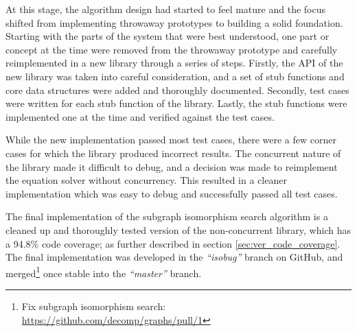 At this stage, the algorithm design had started to feel mature and the focus shifted from implementing throwaway prototypes to building a solid foundation. Starting with the parts of the system that were best understood, one part or concept at the time were removed from the throwaway prototype and carefully reimplemented in a new library through a series of steps. Firstly, the API of the new library was taken into careful consideration, and a set of stub functions and core data structures were added and thoroughly documented. Secondly, test cases were written for each stub function of the library. Lastly, the stub functions were implemented one at the time and verified against the test cases.

While the new implementation passed most test cases, there were a few corner cases for which the library produced incorrect results. The concurrent nature of the library made it difficult to debug, and a decision was made to reimplement the equation solver without concurrency. This resulted in a cleaner implementation which was easy to debug and successfully passed all test cases.

The final implementation of the subgraph isomorphism search algorithm is a cleaned up and thoroughly tested version of the non-concurrent library, which has a 94.8\% code coverage; as further described in section \ref{sec:ver_code_coverage}. The final implementation was developed in the \textit{``isobug''} branch on GitHub, and merged\footnote{Fix subgraph isomorphism search: \url{https://github.com/decomp/graphs/pull/1}} once stable into the \textit{``master''} branch.
